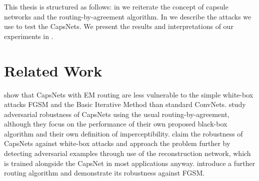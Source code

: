 This thesis is structured as follows: in  we reiterate the concept of capsule networks and the routing-by-agreement algorithm. In  we describe the attacks we use to test the CapsNets. We present the results and interpretations of our experiments in .

\section{Related Work}
\label{sec:related}

\citet{em} show that CapsNets with EM routing are less vulnerable to the simple white-box attacks FGSM \citep{fgsm} and the Basic Iterative Method \citep{bim} than standard ConvNets.
\citet{capsattacktraffic} study adversarial robustness of CapsNets using the usual routing-by-agreement, although they focus on the performance of their own proposed black-box algorithm and their own definition of imperceptibility.
\citet{darccc} claim the robustness of CapsNets against white-box attacks and approach the problem further by detecting adversarial examples through use of the reconstruction network, which is trained alongside the CapsNet in most applications anyway.
\citet{scaledagreement} introduce a further routing algorithm and demonstrate its robustness against FGSM.
